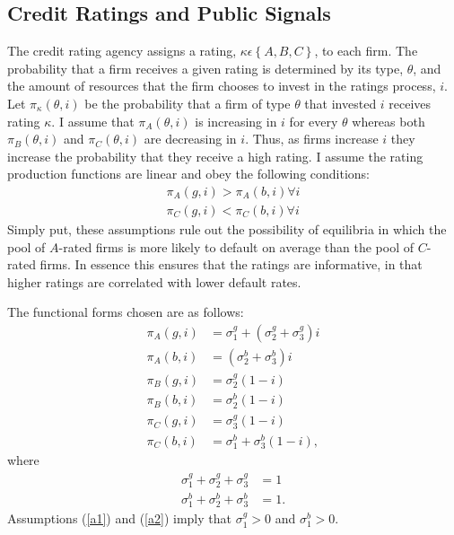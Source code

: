 \documentclass[notitlepage]{article}
\begin{document}
\subsection{Credit Ratings and Public Signals}
The credit rating agency assigns a rating, $\kappa\epsilon\left\{A,B,C\right\}$, to each firm. The probability that a firm receives a given rating is determined by its type, $\theta$, and the amount of resources that the firm chooses to invest in the ratings process, $i$. Let $\pi_{\kappa}(\theta,i)$ be the probability that a firm of type $\theta$ that invested $i$ receives rating $\kappa$. I assume that $\pi_{A}(\theta,i)$ is increasing in $i$ for every $\theta$ whereas both $\pi_{B}(\theta,i)$ and $\pi_{C}(\theta,i)$ are decreasing in $i$. Thus, as firms increase $i$ they increase the probability that they receive a high rating. I assume the rating production functions are linear and obey the following conditions:
\begin{align} 
\label{a1}\pi_{A}(g,i)>\pi_{A}(b,i) \forall i \\
\label{a2}\pi_{C}(g,i)<\pi_{C}(b,i) \forall i 
\end{align}
Simply put, these assumptions rule out the possibility of equilibria in which the pool of $A$-rated firms is more likely to default on average than the pool of $C$-rated firms. In essence this ensures that the ratings are informative, in that higher ratings are correlated with lower default rates.

The functional forms chosen are as follows:
\begin{align*}
	\pi_{A}(g,i) & = \sigma^{g}_{1} + (\sigma^{g}_{2}+\sigma^{g}_{3})i\\
	\pi_{A}(b,i) & =         (\sigma^{b}_{2}+\sigma^{b}_{3})i\\
	\pi_{B}(g,i) & =          \sigma^{g}_{2}(1-i )\\
	\pi_{B}(b,i) & =          \sigma^{b}_{2}(1-i )\\
	\pi_{C}(g,i) & =          \sigma^{g}_{3}(1-i )\\
	\pi_{C}(b,i) & = \sigma^{b}_{1} +  \sigma^{b}_{3}(1-i ),
\end{align*}
where
\begin{align*}
\sigma^{g}_{1}+\sigma^{g}_{2}+\sigma^{g}_{3} & =1\\
\sigma^{b}_{1}+\sigma^{b}_{2}+\sigma^{b}_{3} & =1.
\end{align*}
Assumptions (\ref{a1}) and (\ref{a2}) imply that $\sigma^{g}_{1}>0$ and $\sigma^{b}_{1}>0$.
\end{document}

